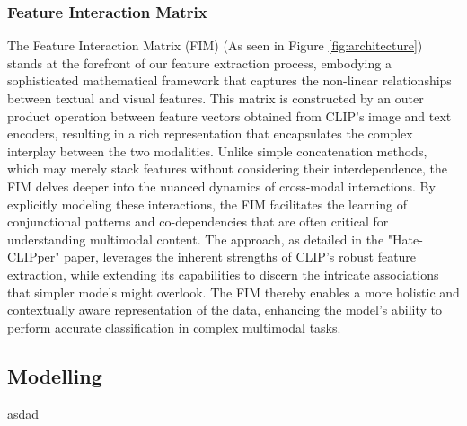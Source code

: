 \subsubsection{Feature Interaction Matrix}
The Feature Interaction Matrix (FIM) (As seen in Figure \ref{fig:architecture}) stands at the forefront of our feature extraction process, embodying a sophisticated mathematical framework that captures the non-linear relationships between textual and visual features. This matrix is constructed by an outer product operation between feature vectors obtained from CLIP’s image and text encoders, resulting in a rich representation that encapsulates the complex interplay between the two modalities. Unlike simple concatenation methods, which may merely stack features without considering their interdependence, the FIM delves deeper into the nuanced dynamics of cross-modal interactions. By explicitly modeling these interactions, the FIM facilitates the learning of conjunctional patterns and co-dependencies that are often critical for understanding multimodal content. The approach, as detailed in the "Hate-CLIPper" paper, leverages the inherent strengths of CLIP’s robust feature extraction, while extending its capabilities to discern the intricate associations that simpler models might overlook. The FIM thereby enables a more holistic and contextually aware representation of the data, enhancing the model's ability to perform accurate classification in complex multimodal tasks.

\subsection{Modelling}
asdad

